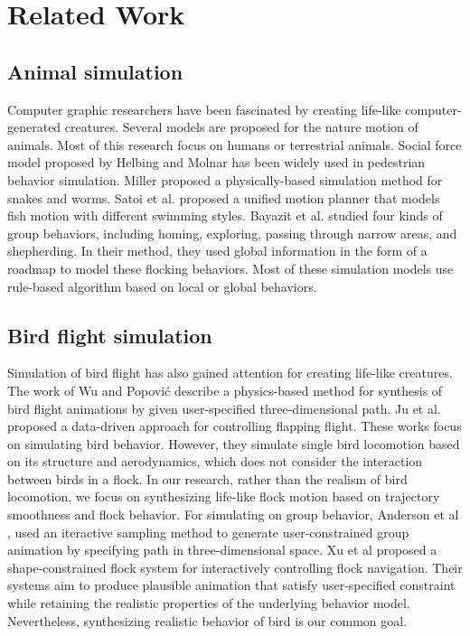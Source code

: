 \chapter{Related Work}

\section{Animal simulation}

Computer graphic researchers have been fascinated by creating life-like computer-generated creatures. Several models are proposed for the nature motion of animals. Most of this research focus on humans or terrestrial animals. Social force model proposed by Helbing and Molnar \cite{Social} has been widely used in pedestrian behavior simulation. Miller \cite{Snake} proposed a physically-based simulation method for snakes and worms. Satoi et al. proposed a unified motion planner \cite{Fish} that models fish motion with different swimming styles. Bayazit et al. \cite{OB1,OB2} studied four kinds of group behaviors, including homing, exploring, passing through narrow areas, and shepherding. In their method, they used global information in the form of a roadmap to model these flocking behaviors. Most of these simulation models use rule-based algorithm based on local or global behaviors.

\section{Bird flight simulation}

Simulation of bird flight has also gained attention for creating life-like creatures. The work of Wu and Popović \cite{Flight} describe a physics-based method for synthesis of bird flight animations by given user-specified three-dimensional path. Ju et al. \cite{Flappy} proposed a data-driven approach for controlling flapping flight. These works focus on simulating bird behavior. However, they simulate single bird locomotion based on its structure and aerodynamics, which does not consider the interaction between birds in a flock. In our research, rather than the realism of bird locomotion, we focus on synthesizing life-like flock motion based on trajectory smoothness and flock behavior. For simulating on group behavior, Anderson et al \cite{Constrained}, used an iteractive sampling method to generate user-constrained group animation by specifying path in three-dimensional space. Xu et al \cite{Shape} proposed a shape-constrained flock system for interactively controlling flock navigation. Their systems aim to produce plausible animation that satisfy user-specified constraint while retaining the realistic properties of the underlying behavior model. Nevertheless, synthesizing realistic behavior of bird is our common goal. 

